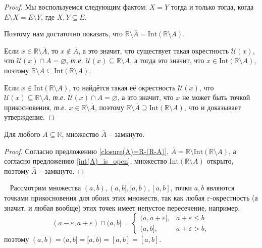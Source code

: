 \begin{proof}
Мы воспользуемся следующим фактом: $X = Y$ тогда и только тогда, когда $E\setminus X = E \setminus Y$, где $X,Y \subseteq E$.

Поэтому нам достаточно показать, что $\mathbb{R} \setminus \overline{A} = \mathrm{Int}( \mathbb{R}\setminus A).$

Если $x \in \mathbb{R} \setminus \overline{A}$, то $x \notin \overline{A}$, а это значит, что существует такая окрестность $\mathscr{U}(x)$, что $\mathscr{U}(x) \cap A = \varnothing$, \textit{т.е.} $\mathscr{U}(x) \subseteq \mathbb{R}\setminus A$, а тогда это значит, что $x \in \mathrm{Int}(\mathbb{R} \setminus A)$, поэтому $\mathbb{R} \setminus \overline{ A} \subseteq \mathrm{Int}(\mathbb{R} \setminus A).$

Если $x \in \mathrm{Int}(\mathbb{R} \setminus A)$, то найдётся такая её окрестность $\mathscr{U}(x)$, что $\mathscr{U}(x) \subseteq \mathbb{R}\setminus A$, \textit{т.е. } $\mathscr{U}(x) \cap A = \varnothing $, а это значит, что $x$ не может быть точкой прикосновения, \textit{т.е.} $x \in \mathbb{R}\setminus \overline{A}$, поэтому $\mathbb{R} \setminus \overline{ A} \supseteq \mathrm{Int}(\mathbb{R} \setminus A)$, что и доказывает утверждение.
\end{proof}

\begin{corollary}
 Для любого $A\subseteq \mathbb{R}$, множество $\overline{A}$ -- замкнуто. \end{corollary}
\begin{proof}
    Согласно предложению \ref{closure(A)=R-(R-A)}, $\overline{A} = \mathbb{R}\setminus \mathrm{Int}(\mathbb{R}\setminus A)$, а согласно предложению \ref{int(A)_is_open}, множество $ \mathrm{Int}(\mathbb{R}\setminus A)$ открыто, поэтому $\overline{A}$ -- замкнуто.
\end{proof}
    
\begin{example}~
 Рассмотрим множества $(a,b), (a,b], [a,b), [a,b]$, точки $a,b$ являются точками прикосновения для обоих этих множеств, так как любая $\varepsilon$-окрестность (а значит, и любая вообще) этих точек имеет непустое пересечение, например,
 \[
  (a-\varepsilon, a+\varepsilon)\cap (a,b] = \begin{cases}
      (a,a+\varepsilon], & a+\varepsilon \le b \\
      (a,b], & a+\varepsilon > b, 
  \end{cases}
 \]
 поэтому $\overline{(a,b)} = \overline{(a,b]} = \overline{[a,b)} = \overline{[a,b]} = [a,b].$
\end{example}

